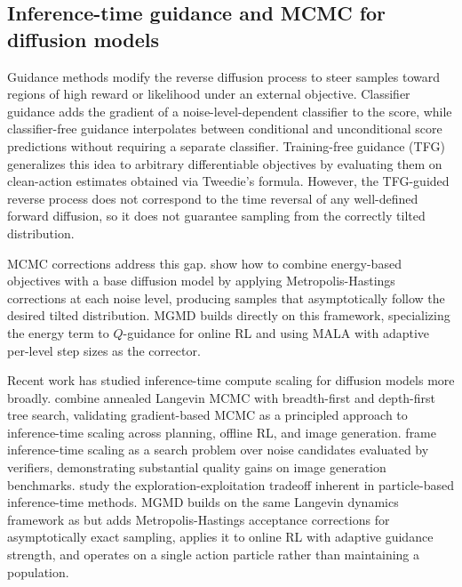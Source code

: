 \documentclass{article}
\theoremstyle{plain}
\theoremstyle{definition}
\theoremstyle{remark}
\begin{document}
\subsection{Inference-time guidance and MCMC for diffusion models}

Guidance methods modify the reverse diffusion process to steer samples toward regions of high reward or likelihood under an external objective.
Classifier guidance \citep{dhariwal2021beatgans} adds the gradient of a noise-level-dependent classifier to the score, while classifier-free guidance \citep{ho2022classifierfree} interpolates between conditional and unconditional score predictions without requiring a separate classifier.
Training-free guidance (TFG) \citep{ye2024tfg,bansal2023universal} generalizes this idea to arbitrary differentiable objectives by evaluating them on clean-action estimates obtained via Tweedie's formula.
However, the TFG-guided reverse process does not correspond to the time reversal of any well-defined forward diffusion, so it does not guarantee sampling from the correctly tilted distribution.

MCMC corrections address this gap.
\citet{du2023reduce_reuse_recycle} show how to combine energy-based objectives with a base diffusion model by applying Metropolis-Hastings corrections at each noise level, producing samples that asymptotically follow the desired tilted distribution.
MGMD builds directly on this framework, specializing the energy term to $Q$-guidance for online RL and using MALA with adaptive per-level step sizes as the corrector.

Recent work has studied inference-time compute scaling for diffusion models more broadly.
\citet{zhang2025inference} combine annealed Langevin MCMC with breadth-first and depth-first tree search, validating gradient-based MCMC as a principled approach to inference-time scaling across planning, offline RL, and image generation.
\citet{ma2025scaling} frame inference-time scaling as a search problem over noise candidates evaluated by verifiers, demonstrating substantial quality gains on image generation benchmarks.
\citet{su2025navigating} study the exploration-exploitation tradeoff inherent in particle-based inference-time methods.
MGMD builds on the same Langevin dynamics framework as \citet{zhang2025inference} but adds Metropolis-Hastings acceptance corrections for asymptotically exact sampling, applies it to online RL with adaptive guidance strength, and operates on a single action particle rather than maintaining a population.
\end{document}
